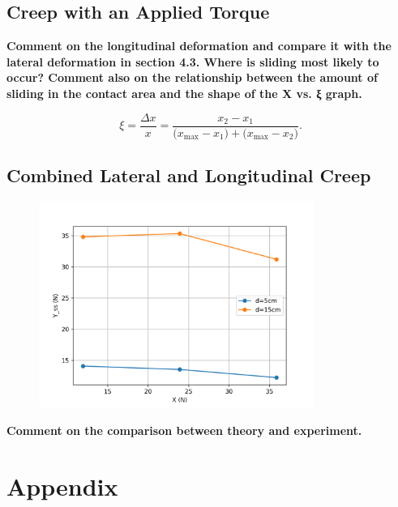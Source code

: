 \documentclass{article}
\begin{document}
\subsection{\textbf{Creep with an Applied Torque}}

\begin{center}
    \textbf{ Comment on the longitudinal deformation and compare it with the lateral deformation
    in section 4.3. Where is sliding most likely to occur? Comment also on the
    relationship between the amount of sliding in the contact area and the shape of the X
    vs.
    ξ graph.}
\end{center}



\begin{equation}
    \xi = \frac{\Delta x}{x} 
     = \frac{x_{2} - x_{1}}
            {\bigl(x_{\max} - x_{1}\bigr) + \bigl(x_{\max} - x_{2}\bigr)}.
\end{equation}

\subsection{\textbf{Combined Lateral and Longitudinal Creep}}

\begin{figure}[H]
    \centering
    \includegraphics[width=0.8\textwidth]{5.3/XvsY.png}
    \caption{}
    \label{fig:lateral_force_vs_longitudinal_force}
\end{figure}

\begin{center}
    \textbf{Comment on the comparison between theory and experiment.}
\end{center}

\section{Appendix}
\end{document}
